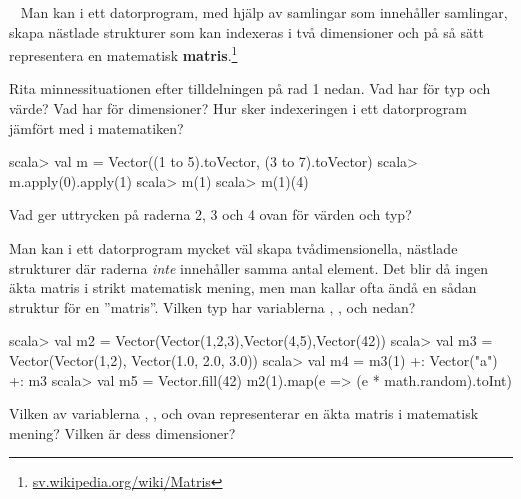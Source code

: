 \QUESTEND





\QUESTBEGIN

\Task  \what~  Man kan i ett datorprogram, med hjälp av samlingar som innehåller samlingar, skapa nästlade strukturer som kan indexeras i två dimensioner och på så sätt representera en matematisk \textbf{matris}.\footnote{\href{https://sv.wikipedia.org/wiki/Matris}{sv.wikipedia.org/wiki/Matris}}

\Subtask Rita minnessituationen efter tilldelningen på rad 1 nedan. Vad har  för typ och värde? Vad har  för dimensioner? Hur sker indexeringen i ett datorprogram jämfört med i matematiken?

\begin{REPL}
scala> val m = Vector((1 to 5).toVector, (3 to 7).toVector)
scala> m.apply(0).apply(1)
scala> m(1)
scala> m(1)(4)
\end{REPL}

\Subtask Vad ger uttrycken på raderna 2, 3 och 4 ovan för värden och typ?

\Subtask Man kan i ett datorprogram mycket väl skapa tvådimensionella, nästlade strukturer där raderna \emph{inte} innehåller samma antal element. Det blir då ingen äkta matris i strikt matematisk mening, men man kallar ofta ändå en sådan struktur för en ''matris''. Vilken typ har variablerna , ,  och  nedan?

\begin{REPL}
scala> val m2 = Vector(Vector(1,2,3),Vector(4,5),Vector(42))
scala> val m3 = Vector(Vector(1,2), Vector(1.0, 2.0, 3.0))
scala> val m4 = m3(1) +: Vector("a") +: m3
scala> val m5 = Vector.fill(42){ m2(1).map(e => (e * math.random).toInt) }
\end{REPL}

\Subtask Vilken av variablerna , ,  och  ovan representerar en äkta matris i matematisk mening? Vilken är dess dimensioner?

\SOLUTION

\TaskSolved \what

